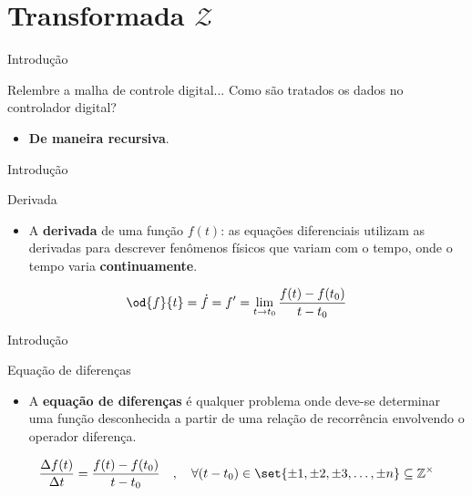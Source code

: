 \section{Transformada \texorpdfstring{$ \mathcal{Z}$}{Z}}
	
\begin{frame}{Introdução}
\begin{block}{Relembre a malha de controle digital...}
	Como são tratados os dados no controlador digital?
	\begin{itemize}
	    \item \textbf{De maneira recursiva}.
	\end{itemize}
\end{block}

\vspace{1cm}

\centering

\scalebox{1}{}

\end{frame}

\begin{frame}{Introdução}
\begin{block}{Derivada}
	\begin{itemize}
		\item A \textbf{derivada} de uma função $ f(t) $: as equações diferenciais utilizam as derivadas para descrever fenômenos físicos que variam com o tempo, onde o tempo varia \textbf{continuamente}.
	\end{itemize}

	\[ \od{f}{t}=\dot{f}=f^{\prime}=\lim\limits_{t\to t_0}\dfrac{f(t)-f(t_0)}{t-t_0} \]
	
\end{block}
\end{frame}

\begin{frame}{Introdução}
\begin{block}{Equação de diferenças}
	\begin{itemize}
		\item A \textbf{equação de diferenças} é qualquer problema onde deve-se determinar uma função desconhecida a partir de uma relação de recorrência envolvendo o operador diferença.
	\end{itemize}
	
	\[ \dfrac{\Delta f(t)}{\Delta t}=\dfrac{f(t)-f(t_0)}{t-t_0}\quad, \quad\forall (t-t_0) \in \set{\pm1, \pm2, \pm3, \ldots, \pm n} \subseteq \mathbb{Z}^{\times} \]
	
\end{block}
\end{frame}
	
